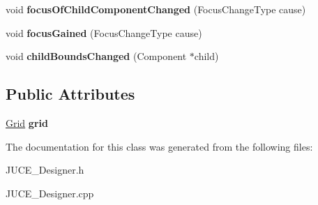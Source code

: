\begin{DoxyCompactItemize}
\item 
\hypertarget{class_j_u_c_e___designer_a424a6a5f43af03e852e903e857fbe7c2}{void {\bfseries focus\-Of\-Child\-Component\-Changed} (Focus\-Change\-Type cause)}\label{class_j_u_c_e___designer_a424a6a5f43af03e852e903e857fbe7c2}

\item 
\hypertarget{class_j_u_c_e___designer_a99a33253baaea60dcd92bc9672025276}{void {\bfseries focus\-Gained} (Focus\-Change\-Type cause)}\label{class_j_u_c_e___designer_a99a33253baaea60dcd92bc9672025276}

\item 
\hypertarget{class_j_u_c_e___designer_a4d55152c47af6e35064ed000f2504d2d}{void {\bfseries child\-Bounds\-Changed} (Component $\ast$child)}\label{class_j_u_c_e___designer_a4d55152c47af6e35064ed000f2504d2d}

\end{DoxyCompactItemize}
\subsection*{Public Attributes}
\begin{DoxyCompactItemize}
\item 
\hypertarget{class_j_u_c_e___designer_a1dc7a4646ff0de0d55ac8311d562e8de}{\hyperlink{class_j_u_c_e___designer_1_1_grid}{Grid} {\bfseries grid}}\label{class_j_u_c_e___designer_a1dc7a4646ff0de0d55ac8311d562e8de}

\end{DoxyCompactItemize}


The documentation for this class was generated from the following files\-:\begin{DoxyCompactItemize}
\item 
J\-U\-C\-E\-\_\-\-Designer.\-h\item 
J\-U\-C\-E\-\_\-\-Designer.\-cpp\end{DoxyCompactItemize}
